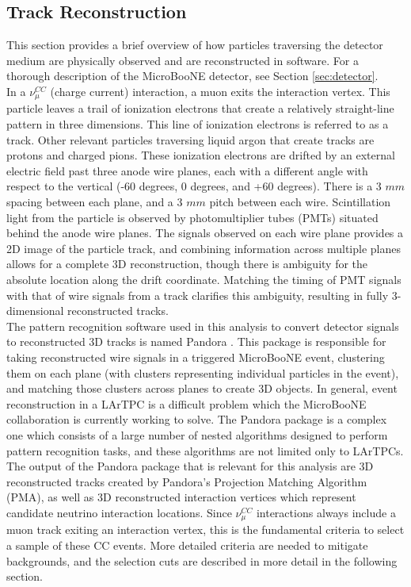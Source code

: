 \subsection{Track Reconstruction}
This section provides a brief overview of how particles traversing the detector medium are physically observed and are reconstructed in software. For a thorough description of the MicroBooNE detector, see Section \ref{sec:detector}.\\

In a $\nu_\mu^{CC}$ (charge current) interaction, a muon exits the interaction vertex. This particle leaves a trail of ionization electrons that create a relatively straight-line pattern in three dimensions. This line of ionization electrons is referred to as a track. Other relevant particles traversing liquid argon that create tracks are protons and charged pions. These ionization electrons are drifted by an external electric field past three anode wire planes, each with a different angle with respect to the vertical (-60 degrees, 0 degrees, and +60 degrees). There is a 3 $mm$ spacing between each plane, and a 3 $mm$ pitch between each wire. Scintillation light from the particle is observed by photomultiplier tubes (PMTs) situated behind the anode wire planes. The signals observed on each wire plane provides a 2D image of the particle track, and combining information across multiple planes allows for a complete 3D reconstruction, though there is ambiguity for the absolute location along the drift coordinate. Matching the timing of PMT signals with that of wire signals from a track clarifies this ambiguity, resulting in fully 3-dimensional reconstructed tracks.\\

The pattern recognition software used in this analysis to convert detector signals to reconstructed 3D tracks is named Pandora \cite{pandora_paper}. This package is responsible for taking reconstructed wire signals in a triggered MicroBooNE event, clustering them on each plane (with clusters representing individual particles in the event), and matching those clusters across planes to create 3D objects. In general, event reconstruction in a LArTPC is a difficult problem which the MicroBooNE collaboration is currently working to solve. The Pandora package is a complex one which consists of a large number of nested algorithms designed to perform pattern recognition tasks, and these algorithms are not limited only to LArTPCs.\\

The output of the Pandora package that is relevant for this analysis are 3D reconstructed tracks created by Pandora's Projection Matching Algorithm (PMA), as well as 3D reconstructed interaction vertices which represent candidate neutrino interaction locations. Since $\nu_\mu^{CC}$ interactions always include a muon track exiting an interaction vertex, this is the fundamental criteria to select a sample of these CC events. More detailed criteria are needed to mitigate backgrounds, and the selection cuts are described in more detail in the following section.

